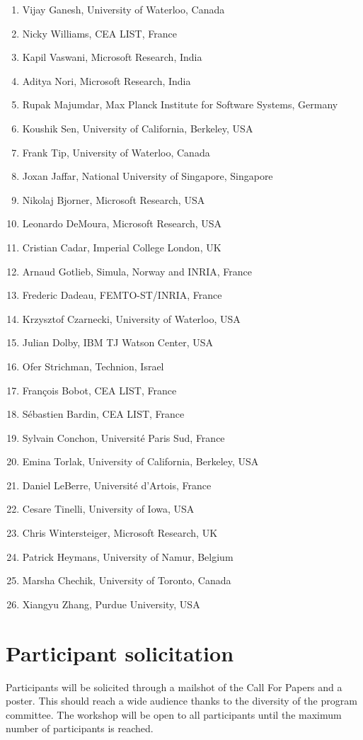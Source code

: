 \documentclass{sig-alternate}
\begin{document}
\begin{enumerate}
\item Vijay Ganesh, University of Waterloo, Canada
\item Nicky Williams, CEA LIST, France
\item Kapil Vaswani, Microsoft Research, India
\item Aditya Nori, Microsoft Research, India
\item Rupak Majumdar, Max Planck Institute for Software Systems, Germany
\item Koushik Sen, University of California, Berkeley, USA
\item Frank Tip, University of Waterloo, Canada
\item Joxan Jaffar, National University of Singapore, Singapore
\item Nikolaj Bjorner, Microsoft Research, USA
\item Leonardo DeMoura, Microsoft Research, USA
\item Cristian Cadar, Imperial College London, UK
\item Arnaud Gotlieb, Simula, Norway and INRIA, France
\item Frederic Dadeau, FEMTO-ST/INRIA, France
\item Krzysztof Czarnecki, University of Waterloo, USA
\item Julian Dolby, IBM TJ Watson Center, USA
\item Ofer Strichman, Technion, Israel
\item Fran{\c c}ois Bobot, CEA LIST, France
\item S{\'e}bastien Bardin, CEA LIST, France
\item Sylvain Conchon, Universit{\'e} Paris Sud, France
\item Emina Torlak, University of California, Berkeley, USA
\item Daniel LeBerre, Universit{\'e} d'Artois, France
\item Cesare Tinelli, University of Iowa, USA
\item Chris Wintersteiger, Microsoft Research, UK
\item Patrick Heymans, University of Namur, Belgium
\item Marsha Chechik, University of Toronto, Canada
\item Xiangyu Zhang, Purdue University, USA
\end{enumerate}

\section{Participant solicitation}
\vspace{0.2cm} Participants will be solicited through a mailshot of
the Call For Papers and a poster. This should reach a wide audience
thanks to the diversity of the program committee.  The workshop will
be open to all participants until the maximum number of participants
is reached.
\end{document}

